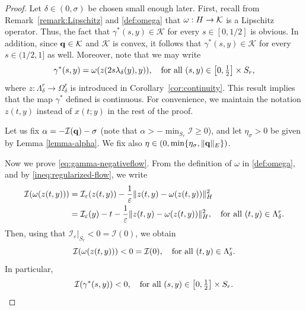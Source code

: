 \documentclass[10pt,a4paper]{amsart}
\newcommand{\Ebanach}{{\textnormal E}}
\newcommand{\Hilb}{{\textnormal H}}
\newcommand{\boI}{\mathcal{I}}
\newcommand{\boK}{\mathcal{K}}
\newcommand{\minq}{{\bf q}}
\begin{document}
\begin{proof}
Let $\delta\in (0,\sigma)$ be chosen small enough later. First, recall from Remark~\ref{remark:Lipschitz} and \eqref{def:omega} that $\omega:\Hilb\to\boK$ is a Lipschitz operator. Thus, the fact that $\gamma^*(s,y)\in\boK$ for every $s\in [0,1/2]$ is obvious. In addition, since $\minq\in\boK$ and $\boK$ is convex, it follows that $\gamma^*(s,y)\in\boK$ for every $s\in (1/2,1]$ as well. Moreover, note that we may write 
\begin{equation}
    \gamma^*(s,y)=\omega(z(2s\lambda_\delta(y),y)),\quad\hbox{for all }(s,y)\in\left[0,\tfrac{1}{2}\right]\times S_r,
\end{equation}where $z:\Lambda_\delta^r\to\Omega_\delta^r$ is introduced in Corollary~\ref{cor:continuity}. This result  implies that the map $\gamma^*$ defined is continuous. For convenience, we maintain the notation $z(t,y)$ instead of $x(t;y)$ in the rest of the proof.



Let us fix $\alpha=-\boI(\minq)-\sigma$ (note that $\alpha>-\min_{S_r}\boI\geq0$), and let $\eta_\sigma>0$ be given by Lemma \ref{lemma-alpha}. We fix also $\eta\in(0,\min\{\eta_\sigma,\|\minq\|_\Ebanach\})$.

Now we prove \eqref{eq:gamma-negativeflow}. From the definition of $\omega$ in \eqref{def:omega}, and by \eqref{ineq:regularized-flow}, we write
\begin{align*}
    \boI(\omega(z(t,y)))&=\boI_\varepsilon(z(t,y))-\dfrac{1}{\varepsilon}\|z(t,y)-\omega(z(t,y))\|_\Hilb^2
    \\
    &=\boI_\varepsilon(y)-t-\dfrac{1}{\varepsilon}\|z(t,y)-\omega(z(t,y))\|_\Hilb^2,\quad\hbox{for all }(t,y)\in\Lambda_\delta^r.
\end{align*}
Then, using that $\boI_\varepsilon|_{S_r}<0=\boI(0)$, we obtain
\begin{equation}\label{ineq:omega-flow}
\boI(\omega(z(t,y)))<0=\boI(0),\quad\hbox{for all }(t,y)\in\Lambda_\delta^r.
\end{equation}
In particular,
\begin{equation} 
    \boI(\gamma^*(s,y))<0, \quad\hbox{for all }(s,y)\in\left[0,\tfrac{1}{2}\right]\times S_r.
\end{equation}


\end{proof}
\end{document}
